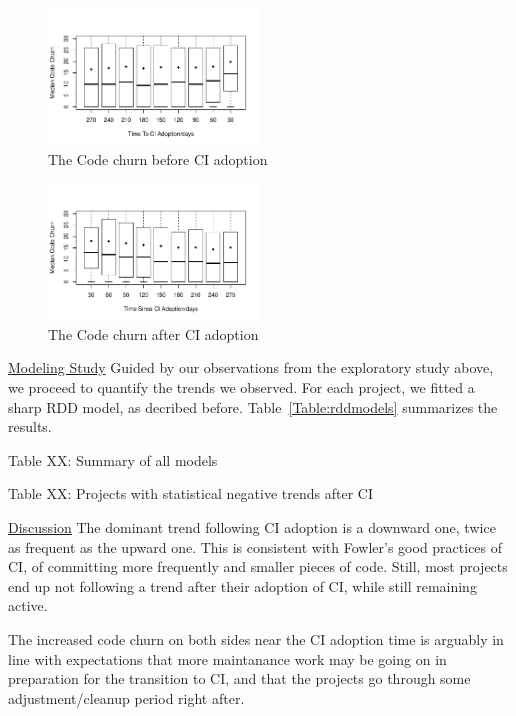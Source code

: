 \documentclass[conference]{IEEEtran}
\begin{document}
\begin{figure}[!t]
\centering
\includegraphics[width=0.5\textwidth]{churn_before.pdf}
\caption{The Code churn before CI adoption}
\label{Fig:CodeChurnBefore}
\end{figure}


\begin{figure}[!t]
\centering
\includegraphics[width=0.5\textwidth]{churn_after.pdf}
\caption{The Code churn after CI adoption}
\label{Fig:CodeChurnAfter}
\end{figure}

\noindent \underline{Modeling Study} 
Guided by our observations from the exploratory study above, we proceed to quantify the trends we observed.
For each project, we fitted a sharp RDD model, as decribed before.
Table~\ref{Table:rddmodels} summarizes the results.

Table XX: Summary of all models

Table XX: Projects with statistical negative trends after CI

\noindent \underline{Discussion}
The dominant trend following CI adoption is a downward one, twice as frequent as the upward one.
This is consistent with Fowler's good practices of CI, of committing more frequently and smaller pieces of code.
Still, most projects end up not following a trend after their adoption of CI, while still remaining active.


The increased code churn on both sides near the CI adoption time is arguably in line with expectations that more maintanance work may be going on in preparation for the transition to CI, and that the projects go through some adjustment/cleanup period right after.
\end{document}
